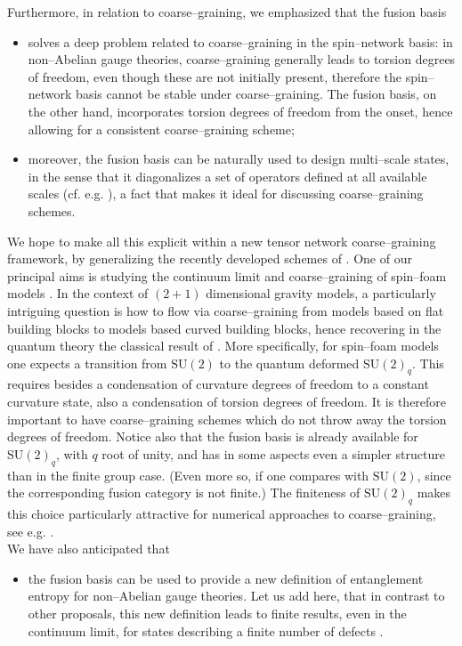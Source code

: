 \documentclass[nofootinbib,superscriptaddress,eqsecnum,tightenlines,11pt]{revtex4-1}
\def\SU{\text{SU}}
\begin{document}
Furthermore, in relation to coarse--graining, we emphasized that the fusion basis
\begin{itemize}
\item solves a deep problem related to coarse--graining in the spin--network basis: in non--Abelian gauge theories, coarse--graining generally leads to torsion degrees of freedom, even though these are not initially present, therefore the spin--network basis cannot be stable under coarse--graining. The fusion basis, on the other hand, incorporates torsion degrees of freedom from the onset, hence allowing for a consistent coarse--graining scheme;
\item moreover, the fusion basis can be naturally used to design multi--scale states, in the sense that it diagonalizes a set of operators defined at all available scales (cf. e.g. \cite{Ashley}), a fact that makes it ideal for discussing coarse--graining schemes.
\end{itemize}
We hope to make all this explicit within a new tensor network coarse--graining framework, by generalizing the recently developed schemes of \cite{DecTNW,Clement}. One of our principal aims is studying the continuum limit and coarse--graining of spin--foam models \cite{BD14,FiniteSF,Clement,BS}. In the context of $(2+1)$ dimensional gravity models, a particularly intriguing question is how to  flow via coarse--graining from models based on flat building blocks to models based curved building blocks, hence recovering in the quantum theory the classical result of \cite{NewRegge}.
More specifically, for spin--foam models one expects a transition from $\SU(2)$ to the quantum deformed $\SU(2)_q$. This requires besides a condensation of curvature degrees of freedom to a constant curvature state, also a condensation of torsion degrees of freedom. It is therefore important to have coarse--graining schemes which do not throw away the torsion degrees of freedom.
Notice also that the fusion basis is already available for $\SU(2)_q$, with $q$ root of unity,  \cite{KKR,DG16} and has in some aspects even a simpler structure than in the finite group case. (Even more so, if one compares with $\SU(2)$, since the corresponding fusion category is not finite.) The finiteness of $\SU(2)_q$ makes this choice particularly attractive for numerical approaches to coarse--graining, see e.g. \cite{DMS13}.\\

We have also anticipated that
\begin{itemize}
\item the fusion basis can be used to provide a new definition of entanglement entropy for non--Abelian gauge theories.  Let us add here, that in contrast to other proposals, this new definition leads to finite results, even in the continuum limit, for states describing a finite number of defects \cite{Toappear}.
\end{itemize}
\end{document}
